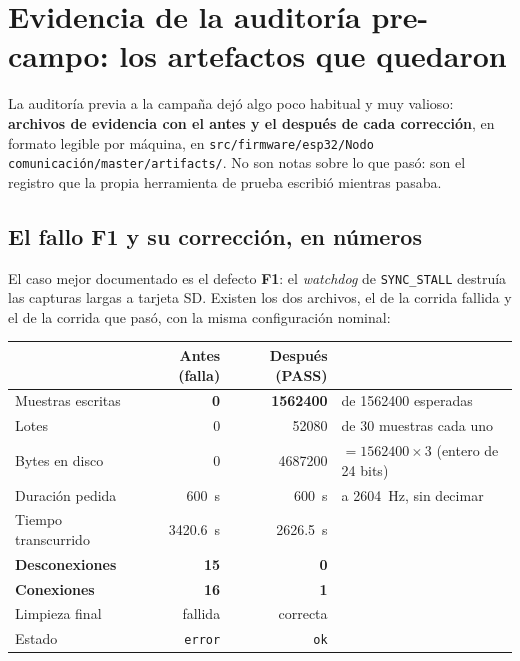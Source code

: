 \section{Evidencia de la auditor\'ia pre-campo: los artefactos que quedaron}
\label{sec:evidencia-auditoria}

La auditor\'ia previa a la campa\~na dej\'o algo poco habitual y muy valioso:
\textbf{archivos de evidencia con el antes y el despu\'es de cada correcci\'on},
en formato legible por m\'aquina, en
\texttt{src/firmware/esp32/Nodo comunicaci\'on/master/artifacts/}. No son notas
sobre lo que pas\'o: son el registro que la propia herramienta de prueba escribi\'o
mientras pasaba.

\subsection{El fallo F1 y su correcci\'on, en n\'umeros}

El caso mejor documentado es el defecto \textbf{F1}: el \emph{watchdog} de
\texttt{SYNC\_STALL} destru\'ia las capturas largas a tarjeta SD. Existen los dos
archivos, el de la corrida fallida y el de la corrida que pas\'o, con la misma
configuraci\'on nominal:

\begin{center}\footnotesize
\begin{tabularx}{\textwidth}{@{}l r r X@{}}
\toprule
& \textbf{Antes (falla)} & \textbf{Despu\'es (PASS)} & \\
\midrule
Muestras escritas & \textbf{0} & \textbf{\num{1562400}} & de \num{1562400} esperadas \\
Lotes & 0 & \num{52080} & de 30 muestras cada uno \\
Bytes en disco & 0 & \num{4687200} & $=\num{1562400}\times3$ (entero de 24 bits) \\
Duraci\'on pedida & \SI{600}{\second} & \SI{600}{\second} & a \SI{2604}{\hertz}, sin decimar \\
Tiempo transcurrido & \SI{3420.6}{\second} & \SI{2626.5}{\second} & \\
\textbf{Desconexiones} & \textbf{15} & \textbf{0} & \\
\textbf{Conexiones} & \textbf{16} & \textbf{1} & \\
Limpieza final & fallida & correcta & \\
Estado & \texttt{error} & \texttt{ok} & \\
\bottomrule
\end{tabularx}
\end{center}

